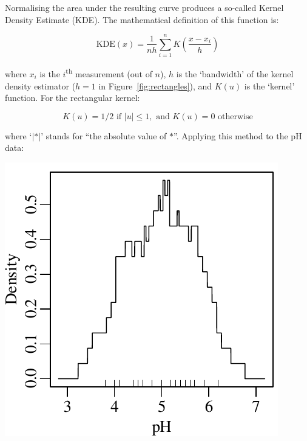 Normalising the area under the resulting curve produces a so-called
Kernel Density Estimate (KDE). The mathematical definition of this
function is:

\begin{equation}
  \mbox{KDE}(x) = \frac{1}{nh} \sum\limits_{i=1}^{n} K\!\left(\frac{x-x_i}{h}\right)
  \label{eq:KDE}
\end{equation}

\noindent where $x_i$ is the $i$\textsuperscript{th} measurement (out
of $n$), $h$ is the `bandwidth' of the kernel density estimator ($h=1$
in Figure~\ref{fig:rectangles}), and $K(u)$ is the `kernel'
function. For the rectangular kernel:

\begin{equation}
  K(u) = 1/2 \mbox{~if~}|u| \leq 1, \mbox{~and~} K(u) = 0 \mbox{~otherwise}
\end{equation}

\noindent where `$|\ast|$' stands for ``the absolute value of
$\ast$''. Applying this method to the pH data:

\noindent\begin{minipage}[t][][b]{.3\textwidth}
  \includegraphics[width=\textwidth]{../figures/pHrectKDE.pdf}\medskip
\end{minipage}
\begin{minipage}[t][][t]{.7\textwidth}
  \label{fig:pHrectKDE}
\end{minipage}

